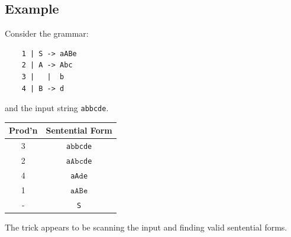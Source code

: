 \documentclass[10pt]{article}
\begin{document}
\subsection*{Example}
Consider the grammar:
\begin{verbatim}
    1 | S -> aABe
    2 | A -> Abc
    3 |   |  b
    4 | B -> d
\end{verbatim}
and the input string \texttt{abbcde}.
\begin{center}
\begin{tabular}{c|c}
    Prod'n & Sentential Form \\
    \hline
    3 & \texttt{a$\boxed{\texttt{b}}$bcde} \\
    2 & \texttt{a$\boxed{\texttt{Abc}}$de} \\
    4 & \texttt{aA$\boxed{\texttt{d}}$e} \\
    1 & $\boxed{\texttt{aABe}}$ \\
    - & \texttt{S}
\end{tabular}
\end{center}
The trick appears to be scanning the input and finding valid sentential forms.
\end{document}
